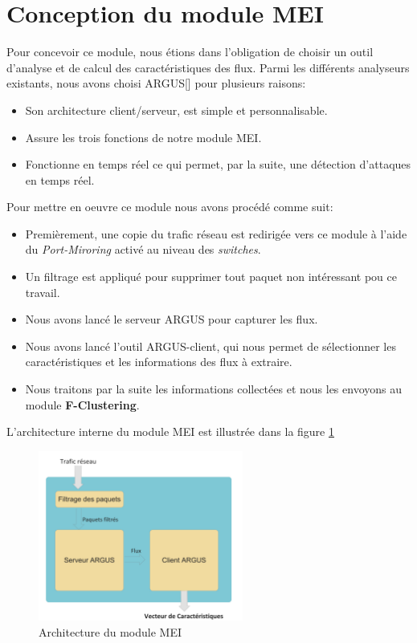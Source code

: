 \section{Conception du module MEI}
Pour concevoir ce module, nous étions dans l’obligation de choisir un outil d’analyse et de calcul des caractéristiques des flux. Parmi les différents analyseurs existants, nous avons choisi ARGUS[\cite{31}] pour plusieurs raisons:\\
\begin{itemize}
\item[-] Son architecture client/serveur, est simple et personnalisable.
\item[-] Assure les trois fonctions de notre module MEI.
\item[-] Fonctionne en temps réel ce qui permet, par la suite, une détection d'attaques en temps réel.\\
\end{itemize} 
Pour mettre en oeuvre ce module nous avons procédé comme suit:\\
\begin{itemize}
\item[1-] Premièrement, une copie du trafic réseau est redirigée vers ce module à l'aide du \textit{Port-Miroring} activé au niveau des \textit{switches}.\\
\item[2-] Un filtrage est appliqué pour supprimer tout paquet non intéressant pou ce travail.\\
\item[3-] Nous avons lancé le serveur ARGUS pour capturer les flux.\\
\item[4-] Nous avons lancé l’outil ARGUS-client, qui nous permet de sélectionner les caractéristiques et les informations des flux à extraire.\\
\item[5-] Nous traitons par la suite les informations collectées et nous les envoyons au module \textbf{F-Clustering}.\\
\end{itemize}

L'architecture interne du module MEI est illustrée dans la figure \ref{fig:MEI}
\begin{figure}[h]
\centering
\includegraphics[width=0.6\textwidth]{Figures/MEI}
\decoRule
\caption{Architecture du module MEI}
\label{fig:MEI}
\end{figure} 

